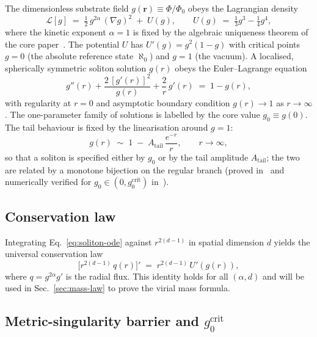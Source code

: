 \documentclass[11pt,a4paper]{article}
\renewcommand{\Phi}{\varPhi}
\newcommand{\PhiZero}{\varPhi_{0}}
\newcommand{\Atail}{A_{\mathrm{tail}}}
\newcommand{\gcrit}{g_{0}^{\mathrm{crit}}}
\begin{document}
The dimensionless substrate field $g(\mathbf{r})\!\equiv\!\Phi/\PhiZero$
obeys the Lagrangian density
\begin{equation}\label{eq:lagrangian}
  \mathcal{L}[g] \;=\;
  \tfrac{1}{2}\,g^{2\alpha}\,(\nabla g)^{2} \;+\; U(g),
  \qquad
  U(g) \;=\; \tfrac{1}{3}g^{3} - \tfrac{1}{4}g^{4},
\end{equation}
where the kinetic exponent $\alpha=1$ is fixed by the
algebraic uniqueness theorem of the core paper~\cite{TGP-core}. The
potential $U$ has $U'(g)=g^{2}(1-g)$ with critical points $g=0$ (the
absolute reference state $\aleph_{0}$) and $g=1$ (the vacuum). A
localised, spherically symmetric soliton solution $g(r)$ obeys the
Euler--Lagrange equation
\begin{equation}\label{eq:soliton-ode}
  \boxed{\;
    g''(r) + \frac{2\,[g'(r)]^{2}}{g(r)}
    + \frac{2}{r}\,g'(r) \;=\; 1 - g(r),
  \;}
\end{equation}
with regularity at $r=0$ and asymptotic boundary condition $g(r)\to 1$
as $r\to\infty$. The one-parameter family of solutions is labelled by
the core value $g_{0}\!\equiv\!g(0)$. The tail behaviour is fixed by
the linearisation around $g=1$:
\begin{equation}\label{eq:tail}
  g(r) \;\sim\; 1 \;-\; \Atail\,\frac{e^{-r}}{r},
  \qquad r \to \infty,
\end{equation}
so that a soliton is specified either by $g_{0}$ or by the tail
amplitude $\Atail$; the two are related by a monotone bijection on the
regular branch (proved in~\cite{TGP-core} and numerically verified for
$g_{0}\in(0,\gcrit)$ in~\cite{TGP-repo}).

\subsection{Conservation law}

Integrating Eq.~\eqref{eq:soliton-ode} against $r^{2(d-1)}$ in spatial
dimension $d$ yields the universal conservation law
\begin{equation}\label{eq:conservation}
  \bigl[r^{2(d-1)}\,q(r)\bigr]' \;=\; r^{2(d-1)}\,U'(g(r)),
\end{equation}
where $q=g^{2\alpha}g'$ is the radial flux. This identity holds for all
$(\alpha,d)$ and will be used in Sec.~\ref{sec:mass-law} to prove the
virial mass formula.

\subsection{Metric-singularity barrier and \texorpdfstring{$\gcrit$}{g0crit}}
\end{document}
